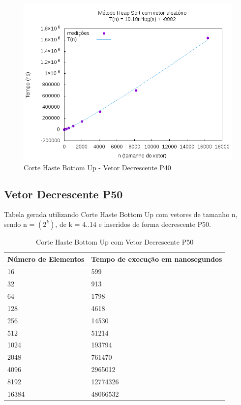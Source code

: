 \documentclass[12pt,a4paper,twoside]{report}
\begin{document}
\begin{figure}[H]
    \centering
    \includegraphics[width=0.7\linewidth]{graficos/HeapSort/vIntAleatorio/vIntAleatorio.png}
  \caption{Corte Haste Bottom Up - Vetor Decrescente P40}
\end{figure}





\subsection{Vetor Decrescente P50}
Tabela gerada utilizando Corte Haste Bottom Up com vetores de tamanho n, sendo n = $(2^k)$, de k = 4..14 e inseridos de forma decrescente P50.
\begin{table}[H]
\centering
\caption{Corte Haste Bottom Up com Vetor Decrescente P50}
\label{my-label}
\begin{tabular}{|l|l|}
\hline
\multicolumn{1}{|c|}{\textbf{Número de Elementos}} & \multicolumn{1}{c|}{\textbf{Tempo de execução em nanosegundos}} \\ \hline
16 & 599 \\ \hline
32 & 913 \\ \hline
64 & 1798 \\ \hline
128 & 4618 \\ \hline
256 & 14530 \\ \hline
512 & 51214 \\ \hline
1024 & 193794 \\ \hline
2048 & 761470 \\ \hline
4096 & 2965012 \\ \hline
8192 & 12774326 \\ \hline
16384 & 48066532 \\ \hline
\end{tabular}
\end{table}
\end{document}

